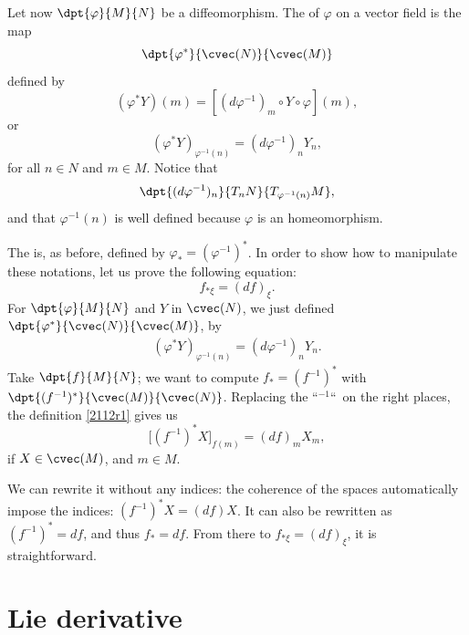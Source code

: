 \begin{definition}	\label{DEFooAHHCooHQMHRk}
	Let now $\dpt{\varphi}{M}{N}$ be a diffeomorphism. The  of $\varphi$ on a vector field is the map
	\[
		\dpt{\varphi^*}{\cvec(N)}{\cvec(M)}
	\]
	defined by
	\[
		(\varphi^*Y)(m)=[(d\varphi^{-1})_m\circ Y\circ\varphi](m),
	\]
	or
	\[
		(\varphi^*Y)_{\varphi^{-1}(n)}=(d\varphi^{-1})_nY_n,
	\]
	for all $n\in N$ and $m\in M$. Notice that \[\dpt{(d\varphi^{-1})_n}{T_nN}{T_{\varphi^{-1}(n)}M},\] and that  $\varphi^{-1}(n)$ is well defined because $\varphi$ is an homeomorphism.
\end{definition}

\begin{definition}	\label{DEFooYTPYooLlyuvd}
	The  is, as before, defined by $\varphi_*=(\varphi^{-1})^*$. In order to show how to manipulate these notations, let us prove the following equation:
	\[
		f_{*\xi}=(df)_{\xi}.
	\]
	For $\dpt{\varphi}{M}{N}$ and $Y$ in $\cvec(N)$, we just defined $\dpt{\varphi^*}{\cvec(N)}{\cvec(M)}$, by
	\begin{eqnarray}
		\label{2112r1}(\varphi^*Y)_{\varphi^{-1}(n)}=(d\varphi^{-1})_nY_n.
	\end{eqnarray}
	Take $\dpt{f}{M}{N}$; we want to compute $f_*=(f^{-1})^*$ with $\dpt{(f^{-1})^*}{\cvec(M)}{\cvec(N)}$. Replacing the ``$^{-1}$``\ on the right places, the definition \eqref{2112r1} gives us
	\[
		\Big[(f^{-1})^*X\Big]_{f(m)}=(df)_mX_m,
	\]
	if $X\in\cvec(M)$, and $m\in M$.
\end{definition}

We can rewrite it without  any indices: the coherence of the spaces automatically impose the indices: $(f^{-1})^*X=(df)X$. It can also be rewritten as $(f^{-1})^*=df$, and thus $f_*=df$. From there to $f_{* \xi}=(df)_{\xi}$, it is straightforward.


\section{Lie derivative}

